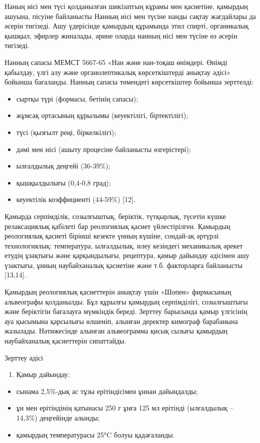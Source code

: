 {{Наның иісі мен түсі қолданылған шикізатгың кұрамы мен қасиетіне,
қамырдың ашуына, пісуіне байланысты Нанның иісі мен түсіне нанды сақтау
жағдайлары да әсерін тигізеді. Ашу үдерісінде қамырдың құрамында этил
спирті, органикалық қышқыл, эфирлер жиналады, әрине оларда нанның иісі
мен түсіне өз әсерін тигізеді.

Нанның сапасы МЕМСТ 5667-65 «Нан және нан-тоқаш өнімдері. Өнімді
қабылдау, үлгі алу және органолептикалық көрсеткіштерді анықтау әдісі»
бойынша бағаланды. Нанның сапасы төмендегі көрсеткіштер бойынша
зерттелді:

\begin{itemize}
\item
  сыртқы түрі (формасы, бетінің сапасы);
\item
  жұмсақ ортасының құрылымы (кеуектілігі, біртектілігі);
\item
  түсі (қызғылт реңі, біркелкілігі);
\item
  дәмі мен иісі (ашыту процесіне байланысты өзгерістері);
\item
  ылғалдылық деңгейі (36-39\%);
\item
  қышқылдылығы (0,4-0,8 град);
\item
  кеуектілік коэффициенті (44-59\%) {[}12{]}.
\end{itemize}

Қамырда серпімділік, созылғыштық, беріктік, түтқырлық, түсетін күшке
релаксациялық қабілеті бар реологиялық қасиет үйлестірілген. Қамырдың
реологиялық қасиеті бірінші кезекте үнның күшіне, сондай-ақ әртүрлі
технологиялық: температура, ылғалдылық, илеу кезіндегі механикалық
әрекет етудің ұзақтығы және қарқындылығы, рецептура, қамыр дайындау
әдісімен ашу үзактығы, ұнның наубайханалық қасиетіне және т.б.
факторларға байланысты {[}13,14{]}.

Қамырдың реологиялық қасиеттерін анықтау үшін «Шопен» фирмасының
альвеографы қолданылды. Бұл құрылғы қамырдың серпімділігі, созылғыштығы
және беріктігін бағалауға мүмкіндік береді. Зерттеу барысында қамыр
үлгісінің ауа қысымына қарсылығы өлшеніп, алынған деректер кимограф
барабанына жазылады. Нәтижесінде алынған альвеограмма қисық сызығы
қамырдың наубайханалық қасиеттерін сипаттайды.

Зерттеу әдісі

\begin{enumerate}
\def\labelenumi{\arabic{enumi}.}
\item
  Қамыр дайындау:
\end{enumerate}

\begin{itemize}
\item
  сынама 2,5\%-дық ас тұзы ерітіндісімен ұннан дайындалды;
\item
  ұн мен ерітіндінің қатынасы 250 г ұнға 125 мл ерітінді (ылғалдылық --
  14,3\%) деңгейінде алынды;
\item
  қамырдың температурасы 25°C болуы қадағаланды.
\end{itemize}

}}
